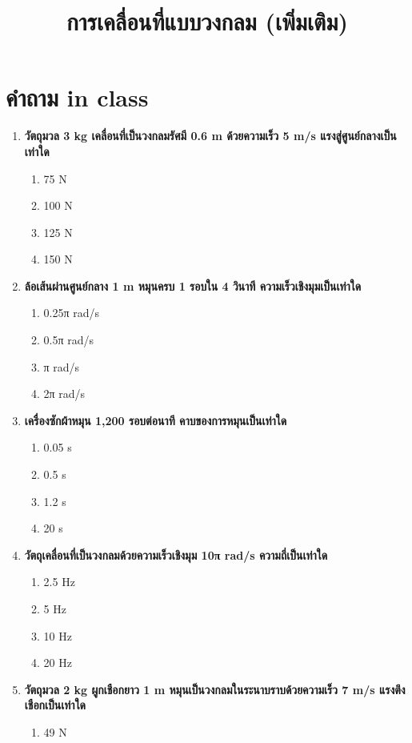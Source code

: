 \documentclass[12pt]{article}
\begin{document}
\title{การเคลื่อนที่แบบวงกลม (เพิ่มเติม)}
\maketitle
\section*{คำถาม in class}
\begin{enumerate}
\def\labelenumi{\arabic*.}
\normalfont
\item \textbf{วัตถุมวล 3 kg เคลื่อนที่เป็นวงกลมรัศมี 0.6 m ด้วยความเร็ว 5 m/s แรงสู่ศูนย์กลางเป็นเท่าใด}
\begin{enumerate}[label=\alph*)]
\item 75 N
\item 100 N
\item 125 N
\item 150 N
\end{enumerate}
\item \textbf{ล้อเส้นผ่านศูนย์กลาง 1 m หมุนครบ 1 รอบใน 4 วินาที ความเร็วเชิงมุมเป็นเท่าใด}
\begin{enumerate}[label=\alph*)]
\item 0.25π rad/s
\item 0.5π rad/s
\item π rad/s
\item 2π rad/s
\end{enumerate}
\item \textbf{เครื่องซักผ้าหมุน 1,200 รอบต่อนาที คาบของการหมุนเป็นเท่าใด}
\begin{enumerate}[label=\alph*)]
\item 0.05 s
\item 0.5 s
\item 1.2 s
\item 20 s
\end{enumerate}
\item \textbf{วัตถุเคลื่อนที่เป็นวงกลมด้วยความเร็วเชิงมุม 10π rad/s ความถี่เป็นเท่าใด}
\begin{enumerate}[label=\alph*)]
\item 2.5 Hz
\item 5 Hz
\item 10 Hz
\item 20 Hz
\end{enumerate}
\item \textbf{วัตถุมวล 2 kg ผูกเชือกยาว 1 m หมุนเป็นวงกลมในระนาบราบด้วยความเร็ว 7 m/s แรงตึงเชือกเป็นเท่าใด}
\begin{enumerate}[label=\alph*)]
\item 49 N

\end{enumerate}
\end{enumerate}
\end{document}

